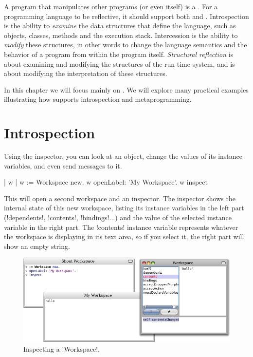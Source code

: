 \documentclass[a4paper,10pt,twoside]{book}
\begin{document}
A program that manipulates other programs (or even itself) is a .
For a programming language to be reflective, it should support both  and .
Introspection is the ability to \emph{examine} the data structures that define the language, such as objects, classes, methods and the execution stack.
Intercession is the ability to \emph{modify} these structures, in other words to change the language semantics and the behavior of a program from within the program itself.
\emph{Structural reflection} is about examining and modifying the structures of the run-time system, and  is about modifying the interpretation of these structures.

In this chapter we will focus mainly on .
We will explore many practical examples illustrating how \st supports introspection and metaprogramming.

\section{Introspection}

Using the inspector, you can look at an object, change the values of its instance variables, and even send messages to it.

\begin{code}{| w |}
w := Workspace new.
w openLabel: 'My Workspace'.
w inspect
\end{code}

This will open a second workspace and an inspector.
The inspector shows the internal state of this new workspace, listing its instance variables in the left part (\ct!dependents!, \ct!contents!, \ct!bindings!...) and the value of the selected instance variable in the right part.
The \ct!contents! instance variable represents whatever the workspace is displaying in its text area, so if you select it, the right part will show an empty string.

\begin{figure}[ht]\centering
	\includegraphics[width=\linewidth]{workspaceInspector}
	\caption{Inspecting a \ct!Workspace!.}
\end{figure}
\end{document}
